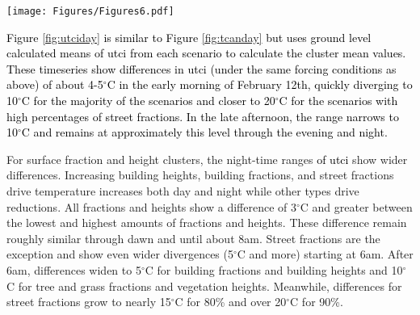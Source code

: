 \documentclass[final,3p,times,authoryear]{elsarticle}
\newcommand{\add}[1]{\textcolor{black}{#1}}
\newcommand{\remove}[1]{\textcolor{red}{\st{}}}
\begin{document}
\begin{figure*}
\centering
\texttt{[image: Figures/Figures6.pdf]}
\caption{\bf \remove{Mean}\add{Canyon averaged air temperature} (\gls{tcan}) \remove{outcomes clustered by}\add{mean values calculated within clusters of }10\% surface fraction ranges of a) grass, b) streets, c) trees, and d) buildings and e) average vegetation and f) average building heights clustered by 0.8m increases \remove{over a}\add{for each hour across the} diurnal cycle of February 12, 2004. The clusters contain fractions up to the fractional or height breakpoint (i.e. 20\% includes the range 10 to 20\%  while 1.6m includes 0.8 to 1.6m). Annotated maximum difference values for each panel shows the maximum difference between 90\% and 10\% fractions or 4.8m and 0.8m heights for daytime(6am-10pm)/night-time (10pm-6am). \add{Background grey line plots show temperature timeseries results for all 9814 scenarios for same day.}}
 \label{fig:tcanday}
\end{figure*}

\add{Figure \ref{fig:utciday} is similar to Figure \ref{fig:tcanday} but uses ground level calculated means of \gls{utci} from each scenario to calculate the cluster mean values. These timeseries show differences in \gls{utci} (under the same forcing conditions as above) of about 4-5$^{\circ}$C in the early morning of February 12th, quickly diverging to 10$^{\circ}$C for the majority of the scenarios and closer to 20$^{\circ}$C for the scenarios with high percentages of street fractions. In the late afternoon, the range narrows to 10$^{\circ}$C and remains at approximately this level through the evening and night.}

For surface fraction and height clusters\remove{, across 14 February 2004 of utci (Figure fig:utciday), which includes the influence of surface temperature (tsfc) and mean radiant temperature (tmrt)}, the night-time ranges \add{of \gls{utci}} show wider differences. Increasing building heights, building fractions, and street fractions drive temperature increases both day and night while other types drive reductions. All fractions and heights show a difference of 3$^{\circ}$C and greater between the lowest and highest amounts of fractions and heights. These difference remain roughly similar through dawn and until about 8am. Street fractions are the exception and show even wider divergences (5$^{\circ}$C and more) starting at 6am. After 6am, differences widen to 5$^{\circ}$C for building fractions and building heights and 10$^{\circ}$C for tree and grass fractions and vegetation heights. Meanwhile, differences for street fractions grow to nearly 15$^{\circ}$C for 80\% and over 20$^{\circ}$C for 90\%.
\end{document}
